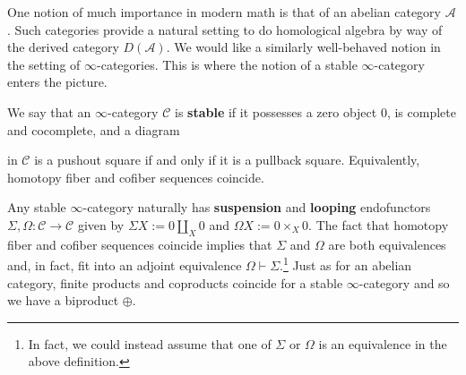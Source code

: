 \documentclass[11pt]{article}
\renewcommand{\A}{\mathcal{A}}
\newcommand{\adj}{\vdash} %
\renewcommand{\C}{\mathscr{C}}
\newcommand{\DDelta}{\mathbf{\mathsf{\Delta}}} %
\begin{document}
\begin{comment}
\section{Background}
Let's start things off with some background info. Let $\DDelta$ denote the \textbf{simplex category} whose objects are sets $[n]:=\{0,1,\ldots,n\}$ for $n\in\Z^{\geq0}$ and morphisms are not-necessarily-strictly order-preserving maps.\footnote{Note that $\DDelta$ is the skeleton of the category of finite ordered sets with monotonic maps as morphisms.} Let $\Set_{\Delta}$ denote the category of \textbf{simplicial sets}, obtained as the presheaf category $\Fun(\DDelta^{\op},\Set)$. The representable objects in $\Set_{\DDelta}$ are called \textbf{standard simplices} and denoted by $\Delta^n:=\Hom_{\DDelta}(\cdot,[n])$. 

For us, an $\infty$-category is defined to be an $(\infty,1)$-category or weak Kan complex satisfying the inner horn filling condition.

Any $\infty$-category $\C$ has a homotopy category $h\C$ with $\Hom_{h\C}(X,Y)=\pi_0\Hom_{\C}(X,Y)$.
\end{comment}

One notion of much importance in modern math is that of an abelian category $\A$. Such categories provide a natural setting to do homological algebra by way of the derived category $D(\A)$. We would like a similarly well-behaved notion in the setting of $\infty$-categories. This is where the notion of a stable $\infty$-category enters the picture.

\begin{definition}
We say that an $\infty$-category $\C$ is \textbf{stable} if it possesses a zero object $0$, is complete and cocomplete, and a diagram
\begin{center}
\end{center}
in $\C$ is a pushout square if and only if it is a pullback square. Equivalently, homotopy fiber and cofiber sequences coincide.
\end{definition}

Any stable $\infty$-category naturally has \textbf{suspension} and \textbf{looping} endofunctors $\Sigma,\Omega: \C\to\C$ given by $\Sigma X:=0\coprod_X0$ and $\Omega X:=0\times_X0$. The fact that homotopy fiber and cofiber sequences coincide implies that $\Sigma$ and $\Omega$ are both equivalences and, in fact, fit into an adjoint equivalence $\Omega\adj\Sigma$.\footnote{In fact, we could instead assume that one of $\Sigma$ or $\Omega$ is an equivalence in the above definition.} Just as for an abelian category, finite products and coproducts coincide for a stable $\infty$-category and so we have a biproduct $\oplus$.
\end{document}
